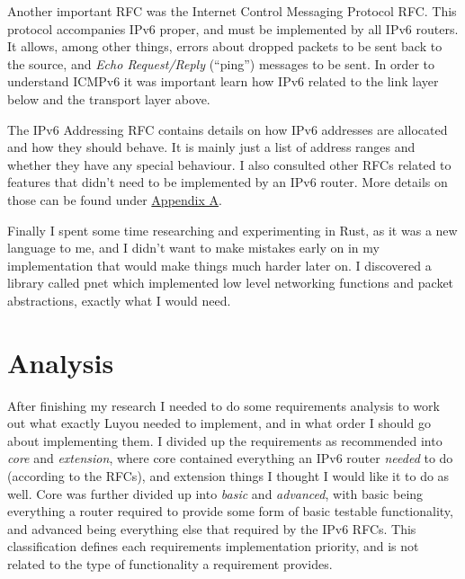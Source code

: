 \documentclass[12pt,a4paper,twoside,openright]{report}
\begin{document}
\bigskip

Another important RFC was the Internet Control Messaging Protocol RFC\cite{icmpv6_rfc}.  This protocol accompanies IPv6 proper, and must be implemented by all IPv6 routers.  It allows, among other things, errors about dropped packets to be sent back to the source, and \textit{Echo Request/Reply} (``ping'') messages to be sent.  In order to understand ICMPv6 it was important learn how IPv6 related to the link layer below and the transport layer above.

\bigskip

The IPv6 Addressing RFC\cite{ipv6_rfc_adr} contains details on how IPv6 addresses are allocated and how they should behave. It is mainly just a list of address ranges and whether they have any special behaviour.  I also consulted other RFCs related to features that didn't need to be implemented by an IPv6 router\cite{slaac_rfc}\cite{dhcpv6_rfc}\cite{ndp_rfc}. More details on those can be found under \hyperref[appendix::requirements]{Appendix A}.

\bigskip

Finally I spent some time researching and experimenting in Rust\cite{rust}, as it was a new language to me, and I didn't want to make mistakes early on in my implementation that would make things much harder later on.  I discovered a library called pnet\cite{pnet_rust} which implemented low level networking functions and packet abstractions, exactly what I would need.

\section{Analysis}

After finishing my research I needed to do some requirements analysis to work out what exactly Luyou needed to implement, and in what order I should go about implementing them.  I divided up the requirements as recommended into \textit{core} and \textit{extension}, where core contained everything an IPv6 router \textit{needed} to do (according to the RFCs), and extension things I thought I would like it to do as well.  Core was further divided up into \textit{basic} and \textit{advanced}, with basic being everything a router required to provide some form of basic testable functionality, and advanced being everything else that required by the IPv6 RFCs.  This classification defines each requirements implementation priority, and is not related to the type of functionality a requirement provides.
\end{document}
